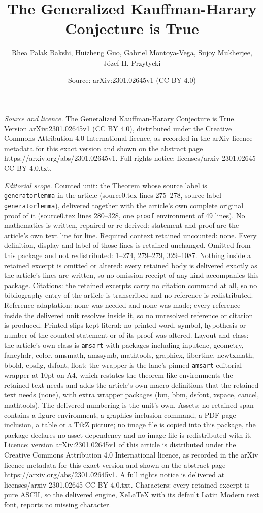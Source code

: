 \documentclass[10pt,a4paper]{amsart}
\title[The Generalized Kauffman-Harary Conjecture is True]{The Generalized Kauffman-Harary Conjecture is True}
\author{Rhea Palak Bakshi, Huizheng Guo, Gabriel Montoya-Vega, Sujoy Mukherjee, J\'ozef H. Przytycki}
\date{Source: arXiv:2301.02645v1 (CC BY 4.0)}
\begin{document}
\maketitle

\noindent\emph{Source and licence.} The Generalized Kauffman-Harary Conjecture is True. Version arXiv:2301.02645v1 (CC BY 4.0), distributed under the Creative Commons Attribution 4.0 International licence, as recorded in the arXiv licence metadata for this exact version and shown on the abstract page https://arxiv.org/abs/2301.02645v1. Full rights notice: licenses/arxiv-2301.02645-CC-BY-4.0.txt.\par\smallskip

\noindent\textit{Editorial scope.} Counted unit: the Theorem whose source label is \texttt{generatorlemma} in the article (source0.tex lines 275--278, source label \texttt{generatorlemma}), delivered together with the article's own complete original proof of it (source0.tex lines 280--328, one \texttt{proof} environment of 49 lines). No mathematics is written, repaired or re-derived: statement and proof are the article's own text line for line. Required context retained uncounted: none. Every definition, display and label of those lines is retained unchanged. Omitted from this package and not redistributed: 1--274, 279--279, 329--1087. Nothing inside a retained excerpt is omitted or altered: every retained body is delivered exactly as the article's lines are written, so no omission receipt of any kind accompanies this package. Citations: the retained excerpts carry no citation command at all, so no bibliography entry of the article is transcribed and no reference is redistributed. Reference adaptation: none was needed and none was made; every reference inside the delivered unit resolves inside it, so no unresolved reference or citation is produced. Printed slips kept literal: no printed word, symbol, hypothesis or number of the counted statement or of its proof was altered. Layout and class: the article's own class is \texttt{amsart} with packages including inputenc, geometry, fancyhdr, color, amsmath, amssymb, mathtools, graphicx, libertine, newtxmath, bbold, epsfig, dsfont, float; the wrapper is the lane's pinned \texttt{amsart} editorial wrapper at 10pt on A4, which restates the theorem-like environments the retained text needs and adds the article's own macro definitions that the retained text needs (none), with extra wrapper packages (bm, bbm, dsfont, xspace, cancel, mathtools). The delivered numbering is the unit's own. Assets: no retained span contains a figure environment, a graphics-inclusion command, a PDF-page inclusion, a table or a TikZ picture; no image file is copied into this package, the package declares no asset dependency and no image file is redistributed with it. Licence: version arXiv:2301.02645v1 of this article is distributed under the Creative Commons Attribution 4.0 International licence, as recorded in the arXiv licence metadata for this exact version and shown on the abstract page https://arxiv.org/abs/2301.02645v1. A full rights notice is delivered at licenses/arxiv-2301.02645-CC-BY-4.0.txt. Characters: every retained excerpt is pure ASCII, so the delivered engine, XeLaTeX with its default Latin Modern text font, reports no missing character.
\end{document}
